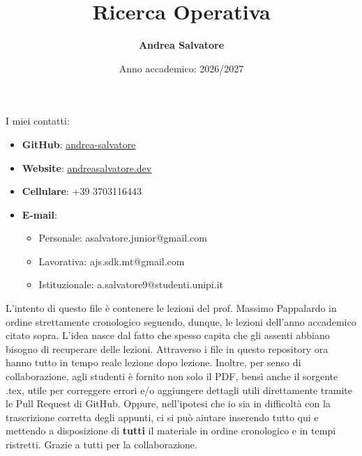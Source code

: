 \documentclass[12pt, a4paper]{article}
\newcommand{\separatore}{\noindent{\color{titlecolor!50}\rule{\textwidth}{0.6pt}}}
\begin{document}
	\title{\textbf{Ricerca Operativa}}
	\author{\textbf{Andrea Salvatore}}
	\date{Anno accademico: 2026/2027}
	\maketitle
	
	I miei contatti:
	\begin{itemize}
		\item \textbf{GitHub}: \href{https://github.com/andrea-salvatore}{andrea-salvatore}
		\item \textbf{Website}: \href{https://andreasalvatore.dev/}{andreasalvatore.dev}
		\item \textbf{Cellulare}: +39 3703116443
		\item \textbf{E-mail}:
		\begin{itemize}
			\item Personale: asalvatore.junior@gmail.com
			\item Lavorativa: ajs.sdk.mt@gmail.com
			\item Istituzionale: a.salvatore9@studenti.unipi.it
		\end{itemize}
	\end{itemize}
	\vspace{1cm}
	
	L'intento di questo file è contenere le lezioni del prof. Massimo Pappalardo in ordine strettamente cronologico seguendo, dunque, le lezioni dell'anno accademico citato sopra. L'idea nasce dal fatto che spesso capita che gli assenti abbiano bisogno di recuperare delle lezioni. Attraverso i file in questo repository ora hanno tutto in tempo reale lezione dopo lezione. Inoltre, per senso di collaborazione, agli studenti è fornito non solo il PDF, bensì anche il sorgente .tex, utile per correggere errori e/o aggiungere dettagli utili direttamente tramite le Pull Request di GitHub. Oppure, nell'ipotesi che io sia in difficoltà con la trascrizione corretta degli appunti, ci si può aiutare inserendo tutto qui e mettendo a disposizione di \textbf{tutti} il materiale in ordine cronologico e in tempi ristretti. Grazie a tutti per la collaborazione.
	
	\separatore
\end{document}
